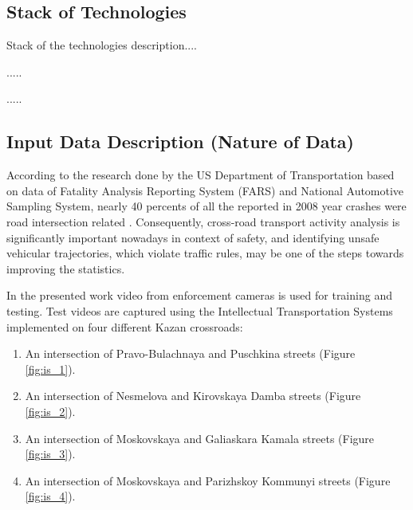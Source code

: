 \subsection{Stack of Technologies}

Stack of the technologies description....

.....

.....

\subsection{Input Data Description (Nature of Data)}

According to the research done by the US Department of Transportation based on data of Fatality Analysis Reporting System (FARS) and National Automotive Sampling System, nearly 40 percents of all the reported in 2008 year crashes were road intersection related \cite{inproceedings:10_cfi}. Consequently, cross-road transport activity analysis is significantly important nowadays in context of safety, and identifying unsafe vehicular trajectories, which violate traffic rules, may be one of the steps towards improving the statistics.

In the presented work video from enforcement cameras is used for training and testing. Test videos are captured using the Intellectual Transportation Systems implemented on four different Kazan crossroads:
\begin{enumerate}
	\item An intersection of Pravo-Bulachnaya and Puschkina streets (Figure \ref{fig:is_1}).
	\item An intersection of Nesmelova and Kirovskaya Damba streets (Figure \ref{fig:is_2}).
	\item An intersection of Moskovskaya and Galiaskara Kamala streets (Figure \ref{fig:is_3}).
	\item An intersection of Moskovskaya and Parizhskoy Kommunyi streets (Figure \ref{fig:is_4}).
\end{enumerate}

